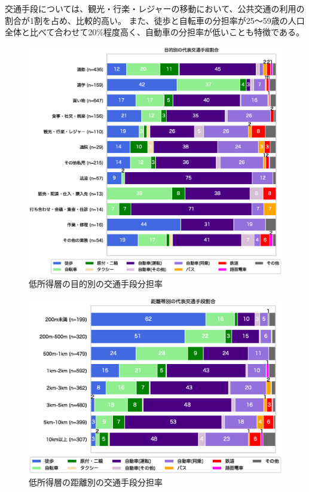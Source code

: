 \documentclass[a4paper,12pt, uplatex]{jsbook}
\begin{document}
\clearpage
交通手段については、観光・行楽・レジャーの移動において、公共交通の利用の割合が1割を占め、比較的高い。
また、徒歩と自転車の分担率が25〜59歳の人口全体と比べて合わせて20\%程度高く、自動車の分担率が低いことも特徴である。
%
\begin{figure}[H]
    \centering
    \includegraphics[width=1.0\textwidth]{picture/mode_share_purpose_低所得.eps}
    \caption{低所得層の目的別の交通手段分担率}
    \label{fig:mode_share_purpose_income}
\end{figure}
%
\begin{figure}[H]
    \centering
    \includegraphics[width=1.0\textwidth]{picture/mode_share_distance_低所得.eps}
    \caption{低所得層の距離別の交通手段分担率}
    \label{fig:mode_share_dist_income}
\end{figure}
\end{document}
